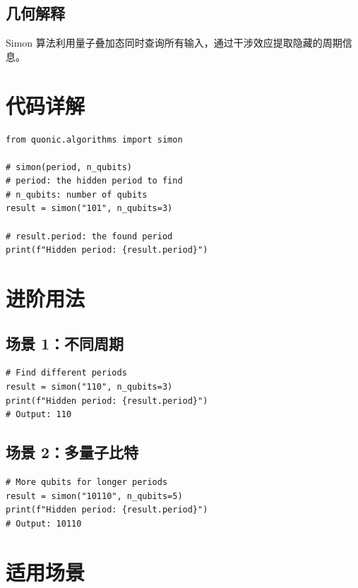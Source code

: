 \documentclass[12pt,a4paper]{article}
\begin{document}
\subsection{几何解释}

Simon 算法利用量子叠加态同时查询所有输入，通过干涉效应提取隐藏的周期信息。

\section{代码详解}

\begin{lstlisting}[style=python]
from quonic.algorithms import simon

# simon(period, n_qubits)
# period: the hidden period to find
# n_qubits: number of qubits
result = simon("101", n_qubits=3)

# result.period: the found period
print(f"Hidden period: {result.period}")
\end{lstlisting}

\section{进阶用法}

\subsection{场景 1：不同周期}

\begin{lstlisting}[style=python]
# Find different periods
result = simon("110", n_qubits=3)
print(f"Hidden period: {result.period}")
# Output: 110
\end{lstlisting}

\subsection{场景 2：多量子比特}

\begin{lstlisting}[style=python]
# More qubits for longer periods
result = simon("10110", n_qubits=5)
print(f"Hidden period: {result.period}")
# Output: 10110
\end{lstlisting}

\section{适用场景}
\end{document}
